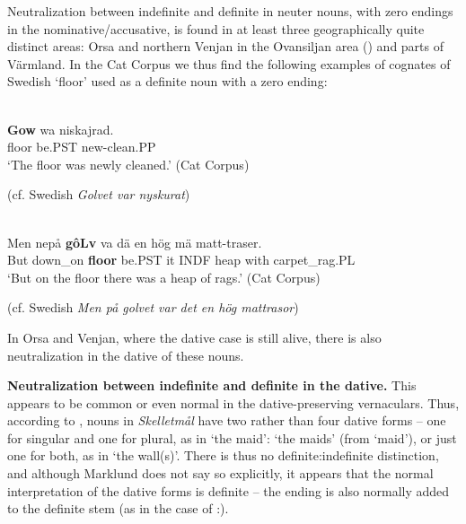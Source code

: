 Neutralization between indefinite and definite in neuter nouns, with zero endings in the nominative/accusative, is found in at least three geographically quite distinct areas: Orsa and northern Venjan in the Ovansiljan area (\citet[133]{Levander1928}) and parts of Värmland. In the Cat Corpus we thus find the following examples of cognates of Swedish  ‘floor’ used as a definite noun with a zero ending:

\ea\label{}
\\
\gll	\textbf{Gow} wa  niskajrad.\\
		floor  be.PST  new-clean.PP\\
\glt 	‘The floor was newly cleaned.’ (Cat Corpus)

\z

(cf. Swedish \textit{Golvet var nyskurat}) 


\ea\label{}
\\
\gll	Men  nepå  \textbf{gôLv} va  dä  en  hög  mä  matt-traser.\\
		But  down\_on  \textbf{floor} be.PST  it  INDF  heap  with  carpet\_rag.PL\\
\glt	‘But on the floor there was a heap of rags.’ (Cat Corpus)

\z

(cf. Swedish \textit{Men på golvet var det en hög mattrasor})


In Orsa and Venjan, where the dative case is still alive, there is also neutralization in the dative of these nouns. 

\textbf{Neutralization between indefinite and definite in the dative.} This appears to be common or even normal in the dative-preserving vernaculars. Thus, according to \citet{Marklund1976}, nouns in \textit{Skelletmål} have two rather than four dative forms – one for singular and one for plural, as in  ‘the maid’:  ‘the maids’ (from  ‘maid’), or just one for both, as in ‘the wall(s)’. There is thus no definite:indefinite distinction, and although Marklund does not say so explicitly, it appears that the normal interpretation of the dative forms is definite – the ending is also normally added to the definite stem (as in the case of :).

